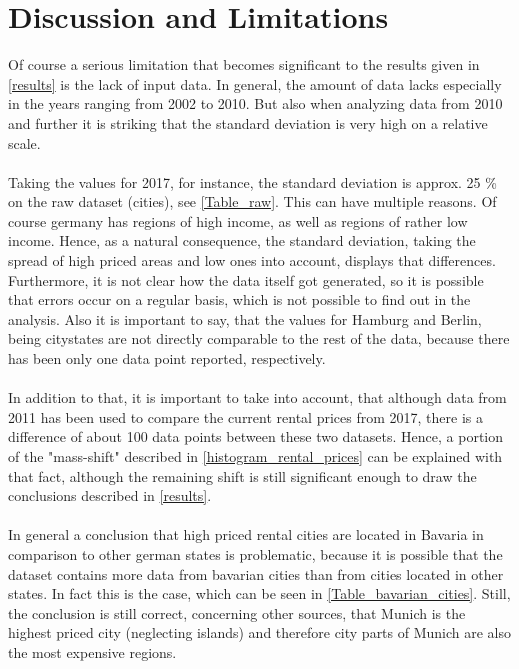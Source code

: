 \documentclass{article}
\begin{document}
	
	
	
	\section{Discussion and Limitations}
	\label{limitations}
	Of course a serious limitation that becomes significant to the results given in \cref{results} is the lack of input data. In general, the amount of data lacks especially in the years ranging from 2002 to 2010. But also when analyzing data from 2010 and further it is striking that the standard deviation is very high on a relative scale.\\\\
	Taking the values for 2017, for instance, the standard deviation is approx. 25 \% on the raw dataset (cities), see \cref{Table_raw}. This can have multiple reasons. Of course germany has regions of high income, as well as regions of rather low income. Hence, as a natural consequence, the standard deviation, taking the spread of high priced areas and low ones into account, displays that differences. Furthermore, it is not clear how the data itself got generated, so it is possible that errors occur on a regular basis, which is not possible to find out in the analysis. Also it is important to say, that the values for Hamburg and Berlin, being citystates are not directly comparable to the rest of the data, because there has been only one data point reported, respectively.\\\\
	In addition to that, it is important to take into account, that although data from 2011 has been used to compare the current rental prices from 2017, there is a difference of about 100 data points between these two datasets. Hence, a portion of the "mass-shift" described in \cref{histogram_rental_prices} can be explained with that fact, although the remaining shift is still significant enough to draw the conclusions described in \cref{results}. \\\\
	In general a conclusion that high priced rental cities are located in Bavaria in comparison to other german states is problematic, because it is possible that the dataset contains more data from bavarian cities than from cities located in other states. In fact this is the case, which can be seen in \cref{Table_bavarian_cities}. Still, the conclusion is still correct, concerning other sources, that Munich is the highest priced city (neglecting islands) and therefore city parts of Munich are also the most expensive regions.\cite{munich_prices}\\\\
\end{document}
